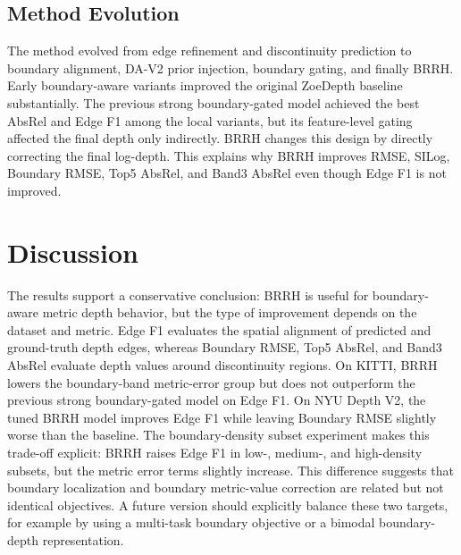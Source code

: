 \documentclass{ieeeaccess}
\begin{document}
\begin{table}[t]
\centering
\small
\caption{Parameter-count profile for the KITTI baseline and BRRH configurations. The frozen DA prior is reported separately because it provides structural guidance but is not trained.}
\label{tab:complexity}
\end{table}

\subsection{Method Evolution}

The method evolved from edge refinement and discontinuity prediction to boundary alignment, DA-V2 prior injection, boundary gating, and finally BRRH. Early boundary-aware variants improved the original ZoeDepth baseline substantially. The previous strong boundary-gated model achieved the best AbsRel and Edge F1 among the local variants, but its feature-level gating affected the final depth only indirectly. BRRH changes this design by directly correcting the final log-depth. This explains why BRRH improves RMSE, SILog, Boundary RMSE, Top5 AbsRel, and Band3 AbsRel even though Edge F1 is not improved.

\section{Discussion}

The results support a conservative conclusion: BRRH is useful for boundary-aware metric depth behavior, but the type of improvement depends on the dataset and metric. Edge F1 evaluates the spatial alignment of predicted and ground-truth depth edges, whereas Boundary RMSE, Top5 AbsRel, and Band3 AbsRel evaluate depth values around discontinuity regions. On KITTI, BRRH lowers the boundary-band metric-error group but does not outperform the previous strong boundary-gated model on Edge F1. On NYU Depth V2, the tuned BRRH model improves Edge F1 while leaving Boundary RMSE slightly worse than the baseline. The boundary-density subset experiment makes this trade-off explicit: BRRH raises Edge F1 in low-, medium-, and high-density subsets, but the metric error terms slightly increase. This difference suggests that boundary localization and boundary metric-value correction are related but not identical objectives. A future version should explicitly balance these two targets, for example by using a multi-task boundary objective or a bimodal boundary-depth representation.
\end{document}
